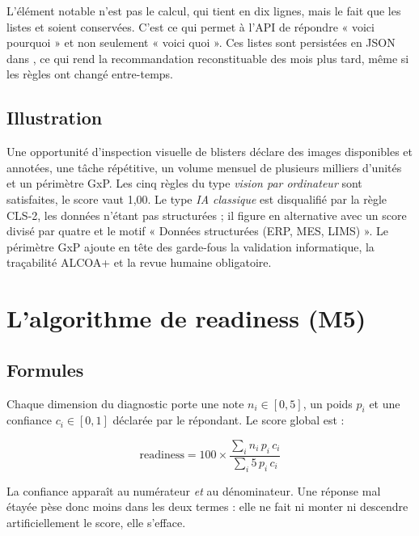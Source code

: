 L'élément notable n'est pas le calcul, qui tient en dix lignes, mais le fait que les
listes  et  soient conservées. C'est ce qui permet à l'API de
répondre « voici pourquoi » et non seulement « voici quoi ». Ces listes sont persistées
en JSON dans , ce qui rend la recommandation
reconstituable des mois plus tard, même si les règles ont changé entre-temps.

\subsection{Illustration}

Une opportunité d'inspection visuelle de blisters déclare des images disponibles et
annotées, une tâche répétitive, un volume mensuel de plusieurs milliers d'unités et un
périmètre GxP. Les cinq règles du type \emph{vision par ordinateur} sont satisfaites, le
score vaut 1,00. Le type \emph{IA classique} est disqualifié par la règle CLS-2, les
données n'étant pas structurées ; il figure en alternative avec un score divisé par
quatre et le motif « Données structurées (ERP, MES, LIMS) ». Le périmètre GxP ajoute en
tête des garde-fous la validation informatique, la traçabilité ALCOA+ et la revue
humaine obligatoire.

\section{L'algorithme de readiness (M5)}

\subsection{Formules}

Chaque dimension du diagnostic porte une note $n_i \in [0,5]$, un poids $p_i$ et une
confiance $c_i \in [0,1]$ déclarée par le répondant. Le score global est :

\begin{equation}
\text{readiness} = 100 \times
\frac{\displaystyle\sum_{i} n_i \, p_i \, c_i}{\displaystyle\sum_{i} 5 \, p_i \, c_i}
\label{eq:readiness}
\end{equation}

La confiance apparaît au numérateur \emph{et} au dénominateur. Une réponse mal étayée
pèse donc moins dans les deux termes : elle ne fait ni monter ni descendre
artificiellement le score, elle s'efface.

